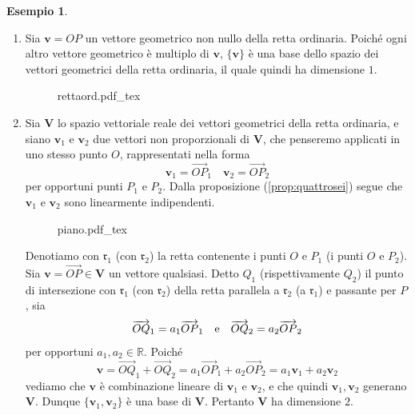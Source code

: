 \documentclass{article}
\theoremstyle{plain}
\theoremstyle{definition}
\newtheorem{exmp}{Esempio}[section]
\theoremstyle{remark}
\newcommand{\incfig}[2][\columnwidth]{%
    \def\svgwidth{#1}
    {#2.pdf_tex}
}
\begin{document}
\begin{exmp}\hfill
    \begin{enumerate}
        \item Sia \( \mathbf{v} = OP \) un vettore geometrico non nullo della retta ordinaria. 
        Poiché ogni altro vettore geometrico è multiplo di \( \mathbf{v} \), \( \{\mathbf{v}\} \) è una base dello spazio dei 
        vettori geometrici della retta ordinaria, il quale quindi ha dimensione $1$.
        \begin{figure}[H]
            \centering
            \incfig[0.5\linewidth]{rettaord}
        \end{figure}
        \item Sia \( \mathbf{V} \) lo spazio vettoriale reale dei vettori geometrici della retta ordinaria, e siano \( \mathbf{v}_1 \) e 
        \( \mathbf{v}_2 \) due vettori non proporzionali di \( \mathbf{V} \), che penseremo applicati in uno stesso punto \( O \), 
        rappresentati nella forma
        \[ \mathbf{v}_1 = \overrightarrow{OP}_1 \quad \mathbf{v}_2 = \overrightarrow{OP}_2 \]
        per opportuni punti \( P_1 \) e \( P_2 \). 
        Dalla proposizione (\ref{prop:quattrosei}) segue che \( \mathbf{v}_1 \) e \( \mathbf{v}_2 \) sono linearmente indipendenti. 
        \begin{figure}[H]
            \centering
            \incfig[0.5\linewidth]{piano}
        \end{figure}
        Denotiamo con \( \mathfrak{r}_1 \) (con \( \mathfrak{r}_2 \)) la retta contenente i punti \( O \) e \( P_1 \) 
        (i punti \( O \) e \( P_2 \)).    
        Sia \( \mathbf{v} = \overrightarrow{OP}\in\mathbf{V} \) un vettore qualsiasi. 
        Detto \( Q_1 \) (rispettivamente \( Q_2 \)) il punto di intersezione con \( \mathfrak{r}_1 \) 
        (con \( \mathfrak{r}_2 \)) della retta parallela a \( \mathfrak{r}_2 \) (a \( \mathfrak{r}_1 \)) e passante per \( P \), sia
        \[ \overrightarrow{OQ}_1 = a_1 \overrightarrow{OP}_1\quad\textup{e}\quad \overrightarrow{OQ}_2 = a_2 \overrightarrow{OP}_2 \]
        per opportuni \( a_1, a_2 \in \mathbb{R} \). 
        Poiché \[ \mathbf{v} = \overrightarrow{OQ}_1 + \overrightarrow{OQ}_2 = a_1 \overrightarrow{OP}_1 + a_2 \overrightarrow{OP}_2 = a_1\mathbf{v}_1 + a_2\mathbf{v}_2 \]
        vediamo che \( \mathbf{v} \) è combinazione lineare di \( \mathbf{v}_1 \) e \( \mathbf{v}_2 \), e che quindi \( \mathbf{v}_1, \mathbf{v}_2 \) generano \( \mathbf{V} \). 
        Dunque \( \{\mathbf{v}_1, \mathbf{v}_2\} \) è una base di \( \mathbf{V} \). 
        Pertanto \( \mathbf{V} \) ha dimensione $2$.

\end{enumerate}
\end{exmp}
\end{document}
